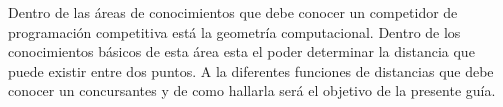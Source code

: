 Dentro de las áreas de conocimientos que debe conocer un competidor de programación competitiva está la geometría computacional. Dentro de los conocimientos básicos de esta área esta el poder determinar la distancia que puede existir entre dos puntos. A la diferentes funciones de distancias que debe conocer un concursantes y de como hallarla será el objetivo de la presente guía.